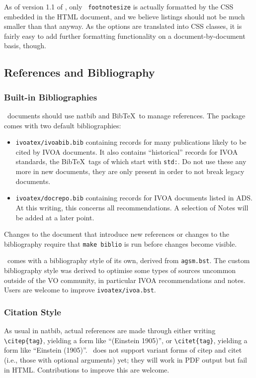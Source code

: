 \documentclass[11pt,a4paper]{ivoa}
\newcommand{\texword}[1]{\texttt{\color{texcolor} #1}}
\newcommand{\BibTeX}{BibTeX}
\begin{document}
As of version 1.1 of \ivoatex, only \texword{footnotesize} is actually
formatted by the CSS embedded in the HTML document, and we believe
listings should not be much smaller than that anyway.  As the options
are translated into CSS classes, it is fairly easy to add further
formatting functionality on a document-by-document basis, though.

\subsection{References and Bibliography}

\subsubsection{Built-in Bibliographies}
\ivoatex\ documents should use natbib and \BibTeX\ to manage references.
The package comes with two default bibliographies:

\begin{itemize}
\item \texttt{ivoatex/ivoabib.bib} containing records for many publications
likely to be cited by IVOA documents.  It also contains ``historical''
records for IVOA standards, the \BibTeX\ tags of which start with
\texttt{std:}.  Do not use these any more in new documents, they are
only present in order to not break legacy documents.
\item\texttt{ivoatex/docrepo.bib} containing records for IVOA documents
listed in ADS.  At this writing, this concerns all recommendations.  A
selection of Notes will be added at a later point.
\end{itemize}

Changes to the document that introduce new references or changes to the
bibliography require that \texttt{make biblio} is run before changes
become visible.

\ivoatex\ comes with a bibliography style of its own, derived from
\texttt{agsm.bst}.  The custom bibliography style was derived to
optimise some types of sources uncommon outside of the VO community, in
particular IVOA recommendations and notes.  Users are welcome to improve
\texttt{ivoatex/ivoa.bst}.

\subsubsection{Citation Style}

As usual in natbib, actual references are made through either writing
\verb|\citep{tag}|, yielding a form like ``(Einstein 1905)'',
or \verb|\citet{tag}|, yielding a form like ``Einstein (1905)''.
\ivoatex\ does not support variant forms of citep and citet (i.e., those
with optional arguments) yet; they will work in PDF output but fail in
HTML.  Contributions to improve this are welcome.
\end{document}
